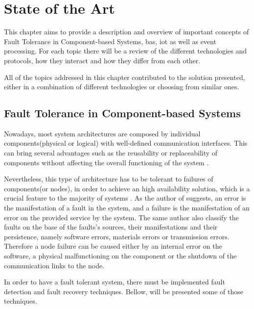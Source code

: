 \chapter{State of the Art}
\label{chapter:state_of_the_art}

This chapter aims to provide a description and overview of important concepts of Fault Tolerance in Component-based Systems, \acf{bas}, \acf{iot} as well as event processing. For each topic there will be a review of the different technologies and protocols, how they interact and how they differ from each other.

All of the topics addressed in this chapter contributed to the solution presented, either in a combination of different technologies or choosing from similar ones.


\section{Fault Tolerance in Component-based Systems}

Nowadays, most system architectures are composed by individual components(physical or logical) with well-defined communication interfaces. This can bring several advantages such as the reusability or replaceability of components without affecting the overall functioning of the system \cite{TutorialsPoint}.

Nevertheless, this type of architecture has to be tolerant to failures of components(or nodes), in order to achieve an high availability solution, which is a crucial feature to the majority of systems \cite{Sun2014a}. As the author of \cite{Zaiter2013} suggests, an error is the manifestation of a fault in the system, and a failure is the manifestation of an error on the provided service by the system. The same author also classify the faults on the base of the faults’s sources, their manifestations and their persistence, namely software errors, materials errors or transmission errors. Therefore a node failure can be caused either by an internal error on the software, a physical malfunctioning on the component or the shutdown of the communication links to the node.

In order to have a fault tolerant system, there must be implemented fault detection and fault recovery techniques. Bellow, will be presented some of those techniques.

